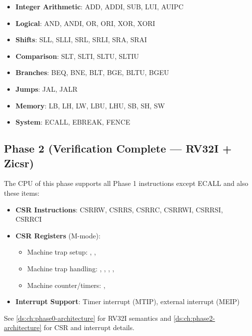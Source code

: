 \begin{itemize}
\tightlist
\item
  \textbf{Integer Arithmetic}: ADD, ADDI, SUB, LUI, AUIPC
\item
  \textbf{Logical}: AND, ANDI, OR, ORI, XOR, XORI
\item
  \textbf{Shifts}: SLL, SLLI, SRL, SRLI, SRA, SRAI
\item
  \textbf{Comparison}: SLT, SLTI, SLTU, SLTIU
\item
  \textbf{Branches}: BEQ, BNE, BLT, BGE, BLTU, BGEU
\item
  \textbf{Jumps}: JAL, JALR
\item
  \textbf{Memory}: LB, LH, LW, LBU, LHU, SB, SH, SW
\item
  \textbf{System}: ECALL, EBREAK, FENCE
\end{itemize}

\subsection{\texorpdfstring{Phase 2 \ok{} (Verification Complete ---
RV32I + Zicsr)}{Phase 2  (Verification Complete --- RV32I + Zicsr)}}\label{um:guide:supported-instructions:phase-2-white-check-mark-verification-complete-rv32i-zicsr}

The CPU of this phase supports all Phase 1 instructions except ECALL and also these items:

\begin{itemize}
\tightlist
\item
  \textbf{CSR Instructions}: CSRRW, CSRRS, CSRRC, CSRRWI, CSRRSI, CSRRCI
\item
  \textbf{CSR Registers} (M-mode):

  \begin{itemize}
  \tightlist
  \item
    Machine trap setup: , , 
  \item
    Machine trap handling: , , ,
    , 
  \item
    Machine counter/\allowbreak{}timers: , 
  \end{itemize}
\item
  \textbf{Interrupt Support}: Timer interrupt (MTIP), external interrupt
  (MEIP)
\end{itemize}

See \cref{ds:ch:phase0-architecture} for RV32I semantics
and \cref{ds:ch:phase2-architecture} for CSR and interrupt
details.

